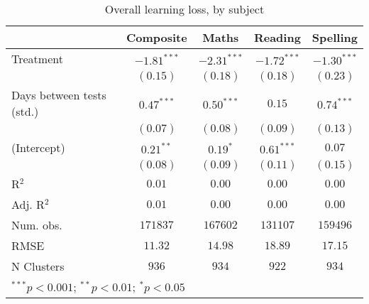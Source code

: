 
\begin{table}
\begin{center}
\begin{tabular}{l c c c c}
\hline
 & Composite & Maths & Reading & Spelling \\
\hline
Treatment                 & $-1.81^{***}$ & $-2.31^{***}$ & $-1.72^{***}$ & $-1.30^{***}$ \\
                          & $(0.15)$      & $(0.18)$      & $(0.18)$      & $(0.23)$      \\
Days between tests (std.) & $0.47^{***}$  & $0.50^{***}$  & $0.15$        & $0.74^{***}$  \\
                          & $(0.07)$      & $(0.08)$      & $(0.09)$      & $(0.13)$      \\
(Intercept)               & $0.21^{**}$   & $0.19^{*}$    & $0.61^{***}$  & $0.07$        \\
                          & $(0.08)$      & $(0.09)$      & $(0.11)$      & $(0.15)$      \\
\hline
R$^2$                     & $0.01$        & $0.00$        & $0.00$        & $0.00$        \\
Adj. R$^2$                & $0.01$        & $0.00$        & $0.00$        & $0.00$        \\
Num. obs.                 & $171837$      & $167602$      & $131107$      & $159496$      \\
RMSE                      & $11.32$       & $14.98$       & $18.89$       & $17.15$       \\
N Clusters                & $936$         & $934$         & $922$         & $934$         \\
\hline
\multicolumn{5}{l}{\scriptsize{$^{***}p<0.001$; $^{**}p<0.01$; $^{*}p<0.05$}}
\end{tabular}
\caption{Overall learning loss, by subject}
\label{table:overall}
\end{center}
\end{table}
